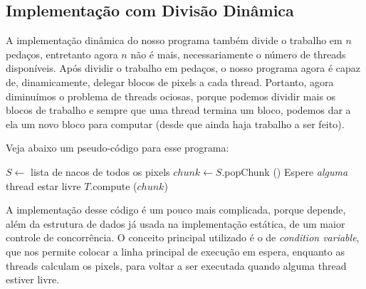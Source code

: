 \documentclass[12pt]{article}
\begin{document}
\subsection{Implementação com Divisão Dinâmica}
A implementação dinâmica do nosso programa também divide o trabalho em
$n$ pedaços, entretanto agora $n$ não é mais, necessariamente o número
de threads disponíveis. Após dividir o trabalho em pedaços, o nosso 
programa agora é capaz de, dinamicamente, delegar blocos de pixels a 
cada thread. Portanto, agora diminuímos o problema de threads ociosas,
porque podemos dividir mais os blocos de trabalho e sempre que uma 
thread termina um bloco, podemos dar a ela um novo bloco para computar 
(desde que ainda haja trabalho a ser feito).

Veja abaixo um pseudo-código para esse programa:
\begin{algorithmic}[1]
    \State $S \gets $ lista de nacos de todos os pixels
        \State $chunk \gets S$.popChunk ()
        \State Espere {\em alguma} thread estar livre
                \State $T$.compute ($chunk$)
            \EndIf
        \EndFor
    \EndWhile 
    \EndFunction
\end{algorithmic}

A implementação desse código é um pouco mais complicada, porque depende,
além da estrutura de dados já usada na implementação estática, de um 
maior controle de concorrência. O conceito principal utilizado é o de 
{\em condition variable}, que nos permite colocar a linha principal de
execução em espera, enquanto as threads calculam os pixels, para voltar
a ser executada quando alguma thread estiver livre.
\end{document}

